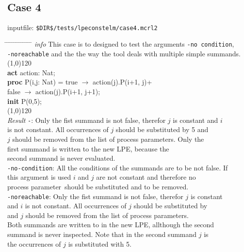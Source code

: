 \index{}\documentclass[a4paper,10pt]{article}
\theoremstyle{plain}
\theoremstyle{definition}
\newcommand{\pp}{process parameter}
\newcommand{\pps}{process parameters}
\newcommand{\ti}{\textit}
\newcommand{\tb}{\textbf}
\newcommand{\tabw}{\hspace*{15.mm} \= \hspace*{20.mm} \= \hspace*{5.mm} \= \hspace*{5.mm} \= \hspace*{5.mm} \= \hspace*{5.mm}  \= \hspace*{5.mm}  \= \hspace*{5.mm}  \= \hspace*{5.mm} \= \hspace*{5.mm} \= \hspace*{5.mm}  \= \hspace*{5.mm}  \= \hspace*{5.mm}\kill}
\begin{document}
\subsection*{Case 4}
inputfile: \verb"$DIR$/tests/lpeconstelm/case4.mcrl2"
\begin{tabbing}
\tabw
\ti{info} \> This case is to designed to test the arguments \verb"-no condition", \\
\> \verb"-noreachable" and the the way the tool deals with multiple simple summands. \\
\line(1,0){120}\\
\tb{act}  \> action: Nat;\\
\tb{proc} \> P(i,j: Nat) \> = \> true  $\rightarrow$ action(j).P(i+1, j)+\\
          \>             \>   \> false $\rightarrow$ action(j).P(i+1, j+1);\\
\tb{init} \> P(0,5);\\
\line(1,0){120}\\
\ti{Result} 
\> \verb"-": \> \> Only the fist summand is not false, therefor $j$ is constant and $i$ \\
\> \> \> is not constant. All occurrences of $j$ should be substituted by 5 and \\
\> \> \> $j$ should be removed from the list of \pps. Only the \\
\> \> \> first summand is written to the new LPE, because the \\
\> \> \> second summand is never evaluated.\\
\> \verb"-no-condition": \> \> All the conditions of the summands are to be not false. If \\
\> \> \> this argument is used $i$ and $j$ are not constant and therefore no \\
\> \> \> \pp\ should be substituted and to be removed.\\
\> \verb"-noreachable": \> \> Only the fist summand is not false, therefor $j$ is constant \\
\> \> \> and $i$ is not constant. All occurrences of $j$ should be substituted by \\
\> \>  and $j$ should be removed from the list of \pps. \\
\> \> \> Both summands are written to in the new LPE, allthough the second \\
\> \> \> summand is never inspected. Note that in the second summand $j$ is \\
\> \> \> the occurrences of $j$ is substituted with 5.\\
\end{tabbing}
\end{document}

